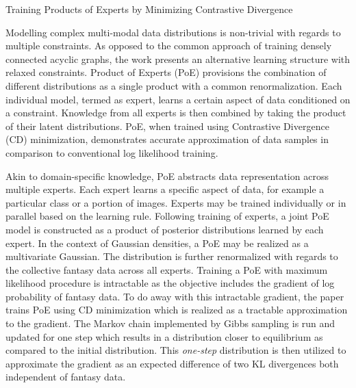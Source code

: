 \documentclass[11pt,letterpaper]{article}
\begin{document}
\begin{center}
  \large{Training Products of Experts by Minimizing Contrastive Divergence}
\end{center}

Modelling complex multi-modal data distributions is non-trivial with regards to multiple constraints. As opposed to the common approach of training densely connected acyclic graphs, the work presents an alternative learning structure with relaxed constraints. Product of Experts (PoE) provisions the combination of different distributions as a single product with a common renormalization. Each individual model, termed as expert, learns a certain aspect of data conditioned on a constraint. Knowledge from all experts is then combined by taking the product of their latent distributions. PoE, when trained using Contrastive Divergence (CD) minimization, demonstrates accurate approximation of data samples in comparison to conventional log likelihood training. 

Akin to domain-specific knowledge, PoE abstracts data representation across multiple experts. Each expert learns a specific aspect of data, for example a particular class or a portion of images. Experts may be trained individually or in parallel based on the learning rule. Following training of experts, a joint PoE model is constructed as a product of posterior distributions learned by each expert. In the context of Gaussian densities, a PoE may be realized as a multivariate Gaussian. The distribution is further renormalized with regards to the collective fantasy data across all experts. Training a PoE with maximum likelihood procedure is intractable as the objective includes the gradient of log probability of fantasy data. To do away with this intractable gradient, the paper trains PoE using CD minimization which is realized as a tractable approximation to the gradient. The Markov chain implemented by Gibbs sampling is run and updated for one step which results in a distribution closer to equilibrium as compared to the initial distribution. This \textit{one-step} distribution is then utilized to approximate the gradient as an expected difference of two KL divergences both independent of fantasy data. 
\end{document}
